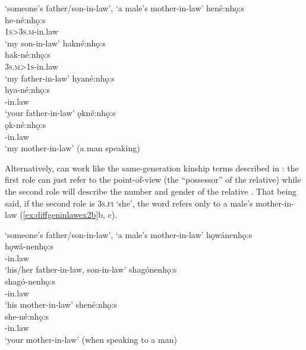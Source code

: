 \ea\label{ex:diffgeninlawex2a}  ‘someone’s father/son-in-law’, ‘a male’s mother-in-law’
\ea hené:nhǫ:s\\\label{ex:diffgeninlawex2aa}
\gll he-né:nhǫ:s\\
 \textsc{1s>3s.m}-in.law\\
\glt `my son-in-law'
\ex hakné:nhǫ:s\\\label{ex:diffgeninlawex2ab}
\gll hak-né:nhǫ:s\\
 \textsc{3s.m>1s}-in.law\\
\glt `my father-in-law'
\ex hyané:nhǫ:s\\\label{ex:diffgeninlawex2ac}
\gll hya-né:nhǫ:s\\
 -in.law\\
\glt `your father-in-law'
\ex ǫkné:nhǫ:s\\\label{ex:diffgeninlawex2ad}
\gll ǫk-né:nhǫ:s\\
-in.law\\
\glt ‘my mother-in-law’ (a man speaking)\\
\z
\z

Alternatively,  can work like the same-generation kinship terms described in : the first role can just refer to the point-of-view (the “possessor” of the relative) while the second role will describe the number and gender of the relative . That being said, if the second role is \textsc{3s.fi} ‘she’, the word refers only to a male’s mother-in-law (\ref{ex:diffgeninlawex2b}b, c).

\ea\label{ex:diffgeninlawex2b}  ‘someone’s father/son-in-law’, ‘a male’s mother-in-law’
\ea hǫwánenhǫ:s\\\label{ex:diffgeninlawex2ba}
\gll hǫwá-nenhǫ:s\\
 -in.law\\
\glt `his/her father-in-law, son-in-law'
\ex shagónenhǫ:s\\\label{ex:diffgeninlawex2bb}
\gll shagó-nenhǫ:s\\
 -in.law\\
\glt `his mother-in-law'
\ex shené:nhǫ:s \\\label{ex:diffgeninlawex2bc}
\gll  she-né:nhǫ:s \\
 -in.law\\
\glt ‘your mother-in-law’ (when speaking to a man)
\z
\z

